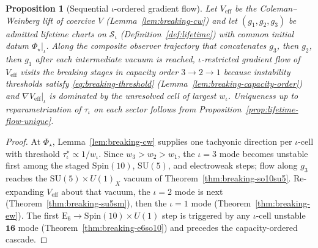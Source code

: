 \documentclass[aps,prd,onecolumn,amsmath,amssymb,nofootinbib,11pt]{revtex4-2}
\numberwithin{equation}{section}
\theoremstyle{plain}
\newtheorem{proposition}[theorem]{Proposition}
\theoremstyle{definition}
\theoremstyle{remark}
\newcommand{\E}[1]{\mathrm{E}_{#1}}
\newcommand{\Spin}{\mathrm{Spin}}
\newcommand{\orderparam}{\Phi}
\begin{document}
\begin{proposition}[Sequential $\iota$-ordered gradient flow]
\label{prop:breaking-sequential}
Let $V_{\mathrm{eff}}$ be the Coleman--Weinberg lift of coercive $V$
(Lemma~\ref{lem:breaking-cw}) and let $(g_1,g_2,g_3)$ be admitted lifetime
charts on $\mathcal{S}_\iota$ (Definition~\ref{def:lifetime}) with common
initial datum $\orderparam_\star|_\iota$. Along the composite observer trajectory
that concatenates $g_3$, then $g_2$, then $g_1$ after each intermediate vacuum is
reached, $\iota$-restricted gradient flow of $V_{\mathrm{eff}}$ visits the
breaking stages in capacity order $3\to2\to1$ because instability thresholds
satisfy \eqref{eq:breaking-threshold} (Lemma~\ref{lem:breaking-capacity-order})
and $\nabla V_{\mathrm{eff}}|_\iota$ is dominated by the unresolved cell of
largest $w_\iota$. Uniqueness up to reparametrization of $\tau_\iota$ on each
sector follows from Proposition~\ref{prop:lifetime-flow-unique}.
\end{proposition}

\begin{proof}
At $\orderparam_\star$, Lemma~\ref{lem:breaking-cw} supplies one tachyonic
direction per $\iota$-cell with threshold $\tau_\iota^\star\propto 1/w_\iota$.
Since $w_3>w_2>w_1$, the $\iota=3$ mode becomes unstable first among the staged
$\Spin(10)$, $\mathrm{SU}(5)$, and electroweak steps; flow along $g_3$ reaches
the $\mathrm{SU}(5)\times U(1)_X$ vacuum of Theorem~\ref{thm:breaking-so10su5}.
Re-expanding $V_{\mathrm{eff}}$ about that vacuum, the $\iota=2$ mode is next
(Theorem~\ref{thm:breaking-su5sm}), then the $\iota=1$ mode
(Theorem~\ref{thm:breaking-ew}). The first $\E{6}\to\Spin(10)\times U(1)$ step
is triggered by any $\iota$-cell unstable $\mathbf{16}$ mode
(Theorem~\ref{thm:breaking-e6so10}) and precedes the capacity-ordered cascade.
\end{proof}
\end{document}
